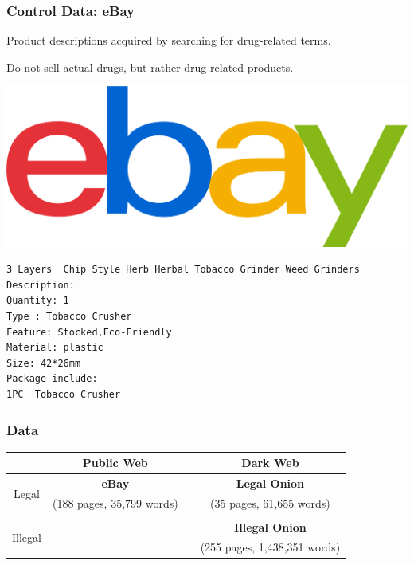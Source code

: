 \documentclass[t,xcolor={svgnames,table}]{beamer}
\begin{document}
\begin{frame}[fragile]
	\frametitle{Control Data: eBay}
	Product descriptions acquired by searching for drug-related terms.
	\vfill
	
	Do not sell actual drugs, but rather drug-related products.
	\vfill
	
	\begin{center}
	\includegraphics[width=.5\textwidth]{ebay.png}
	\end{center}
	\vfill
	
\small
\begin{verbatim}
3 Layers  Chip Style Herb Herbal Tobacco Grinder Weed Grinders
Description:
Quantity: 1
Type : Tobacco Crusher
Feature: Stocked,Eco-Friendly
Material: plastic
Size: 42*26mm
Package include:
1PC  Tobacco Crusher
\end{verbatim}
\end{frame}

\begin{frame}
	\frametitle{Data}
	
	\begin{center}
	\def\arraystretch{2}
	\begin{tabular}{c|ccc}
	& Public Web && Dark Web \\ 
	\hline
	\multirow{2}{*}{Legal} & \textbf{\color{yellow} eBay} && \textbf{\color{green} Legal Onion} \\
	& (188 pages, 35,799 words) && (35 pages, 61,655 words) \\\\
	\multirow{2}{*}{Illegal} &&& \textbf{\color{red} Illegal Onion} \\
	&&& (255 pages, 1,438,351 words)
	\end{tabular}
	\end{center}
\end{frame}
\end{document}
